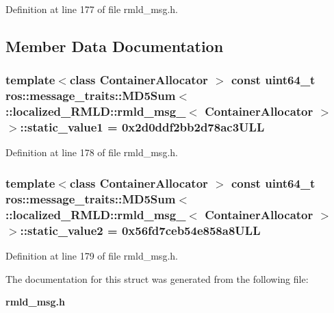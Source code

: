 Definition at line 177 of file rmld\_\-msg.h.



\subsection{Member Data Documentation}
\subsubsection[{static\_\-value1}]{\setlength{\rightskip}{0pt plus 5cm}template$<$class ContainerAllocator $>$ const uint64\_\-t ros::message\_\-traits::MD5Sum$<$ ::{\bf localized\_\-RMLD::rmld\_\-msg\_\-}$<$ ContainerAllocator $>$ $>$::{\bf static\_\-value1} = 0x2d0ddf2bb2d78ac3ULL\hspace{0.3cm}{\ttfamily  [static]}}\label{structros_1_1message__traits_1_1MD5Sum_3_01_1_1localized__RMLD_1_1rmld__msg___3_01ContainerAllocator_01_4_01_4_a467e4860611225913f67cdd0792b485f}


Definition at line 178 of file rmld\_\-msg.h.

\subsubsection[{static\_\-value2}]{\setlength{\rightskip}{0pt plus 5cm}template$<$class ContainerAllocator $>$ const uint64\_\-t ros::message\_\-traits::MD5Sum$<$ ::{\bf localized\_\-RMLD::rmld\_\-msg\_\-}$<$ ContainerAllocator $>$ $>$::{\bf static\_\-value2} = 0x56fd7ceb54e858a8ULL\hspace{0.3cm}{\ttfamily  [static]}}\label{structros_1_1message__traits_1_1MD5Sum_3_01_1_1localized__RMLD_1_1rmld__msg___3_01ContainerAllocator_01_4_01_4_a5f6394273bd57904f5198dbb8792be23}


Definition at line 179 of file rmld\_\-msg.h.



The documentation for this struct was generated from the following file:\begin{DoxyCompactItemize}
\item 
{\bf rmld\_\-msg.h}\end{DoxyCompactItemize}
